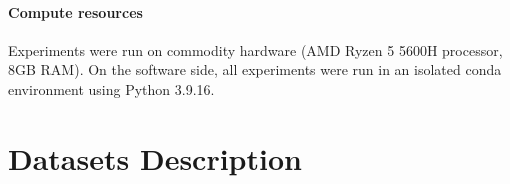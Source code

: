 \documentclass{article}
\begin{document}
\paragraph{Compute resources} Experiments were run on commodity hardware (AMD Ryzen 5 5600H processor, 8GB RAM). On the software side, all experiments were run in an isolated conda environment using Python 3.9.16.





\section{Datasets Description}\label{sec:datasets}
\end{document}
